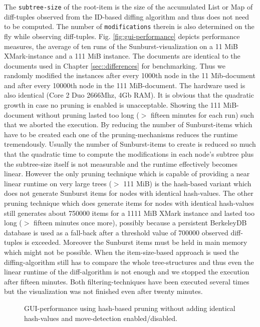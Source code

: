 The \texttt{subtree-size} of the root-item is the size of the accumulated List or Map of diff-tuples observed from the ID-based diffing algorithm and thus does not need to be computed. The number of \texttt{modifications} therein is also determined on the fly while observing diff-tuples. Fig. \ref{fig:gui-performance} depicts performance measures, the average of ten runs of the Sunburst-visualization on a 11 MiB XMark-instance and a 111 MiB instance. The documents are identical to the documents used in Chapter \ref{sec::differences} for benchmarking. Thus we randomly modified the instances after every 1000th node in the 11 Mib-document and after every 10000th node in the 111 MiB-document. The hardware used is also identical (Core 2 Duo 2666Mhz, 4Gb RAM). It is obvious that the quadratic growth in case no pruning is enabled is unacceptable. Showing the 111 MiB-document without pruning lasted too long ($>$ fifteen minutes for each run) such that we aborted the execution. By reducing the number of Sunburst-items which have to be created each one of the pruning-mechanisms reduces the runtime tremendously. Usually the number of Sunburst-items to create is reduced so much that the quadratic time to compute the modifications in each node's subtree plus the subtree-size itself is not measurable and the runtime effectively becomes linear. However the only pruning technique which is capable of providing a near linear runtime on very large trees ($>$ 111 MiB) is the hash-based variant which does not generate Sunburst items for nodes with identical hash-values. The other pruning technique which does generate items for nodes with identical hash-values still generates about 750000 items for a 1111 MiB XMark instance and lasted too long ($>$ fifteen minutes once more), possibly because a persistent BerkeleyDB database is used as a fall-back after a threshold value of 700000 observed diff-tuples is exceeded. Moreover the Sunburst items must be held in main memory which might not be possible. When the item-size-based approach is used the diffing-algorithm still has to compare the whole tree-structures and thus even the linear runtime of the diff-algorithm is not enough and we stopped the execution after fifteen minutes. Both filtering-techniques have been executed several times but the visualization was not finished even after twenty minutes. 

\begin{figure}[tb]
\caption{\label{fig:gui-performance-movedet} GUI-performance using hash-based pruning without adding identical hash-values and move-detection enabled/disabled.}
\end{figure}

